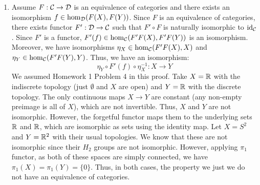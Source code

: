 \documentclass[12pt]{article}
\begin{document}
\begin{solution}
\bbni 
\begin{enumerate}
    \item Assume $F: \mathcal{C} \to \mathcal{D}$ is an equivalence of categories and there exists an isomorphism $f \in \hom_{\mathcal{D}}(F(X), F(Y))$. Since $F$ is an equivalence of categories, there exists functor $F': \mathcal{D} \to \mathcal{C}$ such that $F' \circ F$ is naturally isomorphic to $\operatorname{id}_{\mathcal{C}}$. Since $F'$ is a functor, $F'(f) \in \hom_{\mathcal{C}}(F'F(X), F'F(Y))$ is an isomorphism. Moreover, we have isomorphisms $\eta_X \in \hom_{\mathcal{C}}(F'F(X), X)$ and $\eta_Y \in \hom_{\mathcal{C}}(F'F(Y), Y)$. Thus, we have an isomorphism:
    \[\eta_Y \circ F'(f) \circ \eta_X^{-1}: X \to Y\]
    We assumed Homework 1 Problem 4 in this proof. \bbni
    Take $X = \mathbb R$ with the indiscrete topology (just $\emptyset$ and $X$ are open) and $Y = \mathbb R$ with the discrete topology. The only continuous maps $X \to Y$ are constant (any non-empty preimage is all of $X$), which are not invertible. Thus, $X$ and $Y$ are not isomorphic. However, the forgetful functor maps them to the underlying sets $\mathbb R$ and $\mathbb R$, which are isomorphic as sets using the identity map. \bbni
    Let $X = S^2$ and $Y = \mathbb R^2$ with their usual topologies. We know that these are not isomorphic since their $H_2$ groups are not isomorphic. However, applying $\pi_1$ functor, as both of these spaces are simply connected, we have $\pi_1(X) = \pi_1(Y) = \{0\}$. \bbni
    Thus, in both cases, the property we just we do not have an equivalence of categories.


\end{enumerate}
\end{solution}
\end{document}
